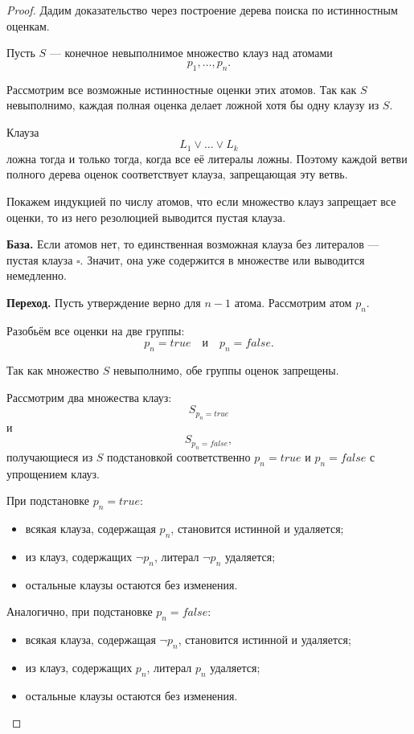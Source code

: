 \documentclass[12pt,a4paper]{article}
\begin{document}
\begin{proof}
Дадим доказательство через построение дерева поиска по истинностным оценкам.

Пусть $S$ --- конечное невыполнимое множество клауз над атомами
$$
p_1,\dots,p_n.
$$

Рассмотрим все возможные истинностные оценки этих атомов. Так как $S$ невыполнимо, каждая полная оценка делает ложной хотя бы одну клаузу из $S$.

Клауза
$$
L_1 \lor \dots \lor L_k
$$
ложна тогда и только тогда, когда все её литералы ложны. Поэтому каждой ветви полного дерева оценок соответствует клауза, запрещающая эту ветвь.

Покажем индукцией по числу атомов, что если множество клауз запрещает все оценки, то из него резолюцией выводится пустая клауза.

\textbf{База.} Если атомов нет, то единственная возможная клауза без литералов --- пустая клауза $\square$. Значит, она уже содержится в множестве или выводится немедленно.

\textbf{Переход.} Пусть утверждение верно для $n-1$ атома. Рассмотрим атом $p_n$.

Разобьём все оценки на две группы:
$$
p_n = true
\quad\text{и}\quad
p_n = false.
$$

Так  как множество $S$ невыполнимо, обе группы оценок запрещены.

Рассмотрим два множества клауз:
\[
S_{p_n=true}
\]
и
\[
S_{p_n=false},
\]
получающиеся из $S$ подстановкой соответственно $p_n=true$ и $p_n=false$ с упрощением клауз.

При подстановке $p_n=true$:
\begin{itemize}
    \item всякая клауза, содержащая $p_n$, становится истинной и удаляется;
    \item из клауз, содержащих $\neg p_n$, литерал $\neg p_n$ удаляется;
    \item остальные клаузы остаются без изменения.
\end{itemize}

Аналогично, при подстановке $p_n=false$:
\begin{itemize}
    \item всякая клауза, содержащая $\neg p_n$, становится истинной и удаляется;
    \item из клауз, содержащих $p_n$, литерал $p_n$ удаляется;
    \item остальные клаузы остаются без изменения.
\end{itemize}


\end{proof}
\end{document}

